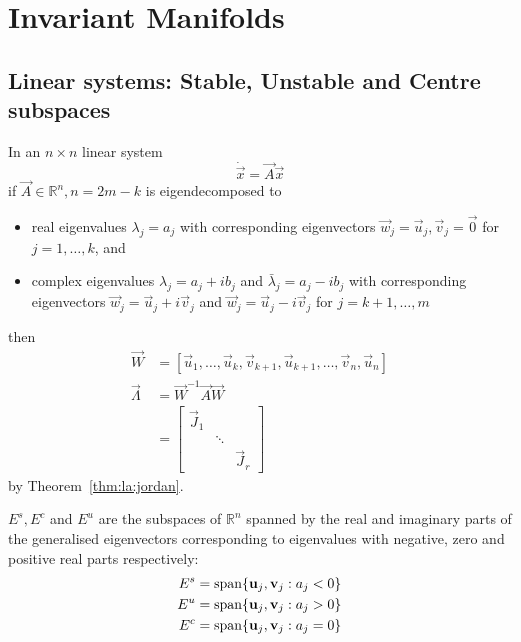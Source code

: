 \section{Invariant Manifolds}
\subsection{Linear systems: Stable, Unstable and Centre subspaces}
In an $n \times n$ linear system
\begin{equation*}
	\dot{\vec x} = \vec A \vec x
\end{equation*}
if $\vec A \in \mathbb R^n, n = 2m - k$ is eigendecomposed to
\begin{itemize}
 	\item real eigenvalues $\lambda_j = a_j$ with corresponding eigenvectors $\vec w_j = \vec u_j, \vec v_j = \vec 0$ for $j = 1, \dotsc, k$, and
 	\item complex eigenvalues $\lambda_j = a_j + ib_j$ and $\bar \lambda_j = a_j - ib_j$ with corresponding eigenvectors $\vec w_j = \vec u_j + i\vec v_j$ and $\vec w_j = \vec u_j - i\vec v_j$ for $j = k + 1, \dotsc, m$
\end{itemize}
then
\begin{align*}
	\vec W 			&= [\vec u_1, \dotsc, \vec u_k, \vec v_{k + 1}, \vec u_{k + 1}, \dotsc, \vec v_n, \vec u_n] \\
	\vec \Lambda 	&= \vec W^{-1} \vec A \vec W \\
					&=
						\begin{bmatrix}
							\vec J_1 	& 			& \\
										& \ddots 	& \\
										&			& \vec J_r
						\end{bmatrix}
\end{align*}
by Theorem~\ref{thm:la:jordan}.

\begin{definition}
	$E^s, E^c$ and $E^u$ are the subspaces of $\mathbb R^n$ spanned by the real and imaginary parts of the generalised eigenvectors corresponding to eigenvalues with negative, zero and positive real parts respectively:
	\begin{align*}
		E^s &= \operatorname{span}\{\boldsymbol{\mathbf{u}}_j, \boldsymbol{\mathbf{v}}_j: a_j < 0\} \\
		E^u &= \operatorname{span}\{\boldsymbol{\mathbf{u}}_j, \boldsymbol{\mathbf{v}}_j: a_j > 0\} \\
		E^c &= \operatorname{span}\{\boldsymbol{\mathbf{u}}_j, \boldsymbol{\mathbf{v}}_j: a_j = 0\}
	\end{align*}
\end{definition}

